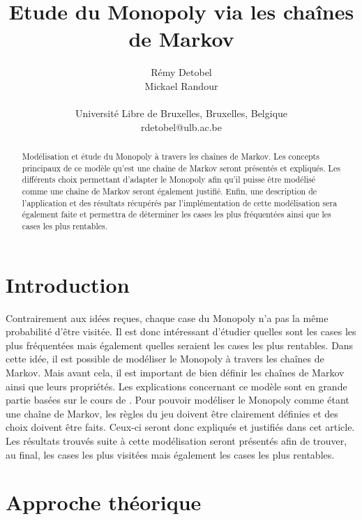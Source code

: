 \documentclass[letterpaper]{article}
\title{Etude du Monopoly via les chaînes de Markov}
\author{Rémy Detobel\\
Mickael Randour\\
\mbox{}\\
Université Libre de Bruxelles, Bruxelles, Belgique \\
rdetobel@ulb.ac.be}
\begin{document}
\maketitle

\begin{abstract}
  Modélisation et étude du Monopoly à travers les chaînes de Markov.
  Les concepts principaux de ce modèle qu'est une chaîne de Markov
  seront présentés et expliqués.  Les différents choix permettant
  d'adapter le Monopoly afin qu'il puisse être modélisé comme une chaîne
  de Markov seront également justifié.  Enfin, une description de
  l'application et des résultats récupérés par l'implémentation de cette
  modélisation sera également faite et permettra de déterminer les cases
  les plus fréquentées ainsi que les cases les plus rentables.
\end{abstract}

\section{Introduction}
  Contrairement aux idées reçues, chaque case du Monopoly n'a pas la même
  probabilité d'être visitée.  Il est donc intéressant d'étudier quelles sont
  les cases les plus fréquentées mais également quelles seraient les cases
  les plus rentables.  Dans cette idée, il est possible de modéliser
  le Monopoly à travers les chaînes de Markov.  Mais avant cela, il est
  important de bien définir les chaînes de Markov ainsi que leurs propriétés.
  Les explications concernant ce modèle sont en grande partie basées
  sur le cours de \citet{COURS}.
  Pour pouvoir modéliser le Monopoly comme étant une chaîne de Markov,
  les règles du jeu doivent être clairement définies et des choix doivent
  être faits.  Ceux-ci seront donc expliqués et justifiés dans cet article.
  Les résultats trouvés suite à cette modélisation seront présentés afin
  de trouver, au final, les cases les plus visitées mais également les cases
  les plus rentables.


\section{Approche théorique}
\end{document}
